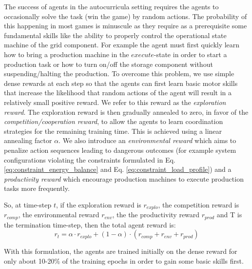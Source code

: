 The success of agents in the autocurricula setting requires the agents to occasionally solve the task (win the game) by random actions. The probability of this happening in most games is minuscule as they require as a prerequisite some fundamental skills like the ability to properly control the operational state machine of the grid component. For example the agent must first quickly learn how to bring a production machine in the $execute$-state in order to start a production task or how to turn on/off the storage component without suspending/halting the production. To overcome this problem, we use simple dense rewards at each step so that the agents can first learn basic motor skills that increase the likelihood that random actions of the agent will result in a relatively small positive reward. We refer to this reward as the \textit{exploration reward}. The exploration reward is then gradually annealed to zero, in favor of the \textit{competition/cooperation reward}, to allow the agents to learn coordination strategies for the remaining training time. This is achieved using a linear annealing factor $\alpha$. We also introduce an \textit{environmental reward} which aims to penalize action sequences leading to dangerous outcomes (for example system configurations violating the constraints formulated in Eq. \ref{eq:constraint_energy_balance} and Eq. \ref{eq:constraint_load_profile}) and a \textit{productivity reward} which encourage production machines to execute production tasks more frequently. 

So, at time-step $t$, if the exploration reward is $r_{explo}$, the competition reward is $r_{comp}$, the environmental reward $r_{env}$, the the productivity reward $r_{prod}$ and T is the termination time-step, then the total agent reward is:
\begin{equation}
\label{eq:total_reward}	
	r_t = \alpha \cdot r_{explo} + (1 - \alpha) \cdot (r_{comp} + r_{env} + r_{prod})
\end{equation} 

With this formulation, the agents are trained initially on the dense reward for only about 10-20\% of the training epochs in order to gain some basic skills first. 
